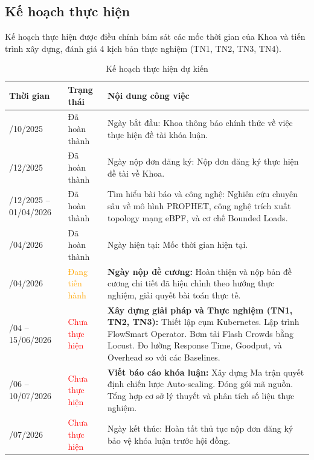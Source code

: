 \documentclass[14pt]{article}
\begin{document}
\subsection{Kế hoạch thực hiện}

Kế hoạch thực hiện được điều chỉnh bám sát các mốc thời gian của Khoa và tiến trình xây dựng, đánh giá 4 kịch bản thực nghiệm (TN1, TN2, TN3, TN4).

\begin{table}[H]
\centering
\caption{Kế hoạch thực hiện dự kiến}
\renewcommand{\arraystretch}{1.4}
\begin{tabular}{|>{\raggedright\arraybackslash}p{2.6cm}
                |>{\centering\arraybackslash}p{3.2cm}
                |>{\raggedright\arraybackslash}p{8.6cm}|}
\hline
\textbf{Thời gian} & \textbf{Trạng thái} & \textbf{Nội dung công việc} \\ \hline
19/10/2025
  & \textcolor{green!70!black}{Đã hoàn thành}
  & Ngày bắt đầu: Khoa thông báo chính thức về việc thực hiện đề tài khóa luận. \\ \hline
26/12/2025 
  & \textcolor{green!70!black}{Đã hoàn thành}
  & Ngày nộp đơn đăng ký: Nộp đơn đăng ký thực hiện đề tài về Khoa. \\ \hline
26/12/2025 -- 01/04/2026
  & \textcolor{green!70!black}{Đã hoàn thành}
  & Tìm hiểu bài báo và công nghệ: Nghiên cứu chuyên sâu về mô hình PROPHET, công nghệ trích xuất topology mạng eBPF, và cơ chế Bounded Loads. \\ \hline
04/04/2026
  & \textcolor{green!70!black}{Đã hoàn thành}
  & Ngày hiện tại: Mốc thời gian hiện tại. \\ \hline
06/04/2026
  & \textcolor{orange}{Đang tiến hành}
  & \textbf{Ngày nộp đề cương:} Hoàn thiện và nộp bản đề cương chi tiết đã hiệu chỉnh theo hướng thực nghiệm, giải quyết bài toán thực tế. \\ \hline
07/04 -- 15/06/2026
  & \textcolor{red}{Chưa thực hiện}
  & \textbf{Xây dựng giải pháp và Thực nghiệm (TN1, TN2, TN3):} Thiết lập cụm Kubernetes. Lập trình FlowSmart Operator. Bơm tải Flash Crowds bằng Locust. Đo lường Response Time, Goodput, và Overhead so với các Baselines. \\ \hline
01/06 -- 10/07/2026
  & \textcolor{red}{Chưa thực hiện}
  & \textbf{Viết báo cáo khóa luận:} Xây dựng Ma trận quyết định chiến lược Auto-scaling. Đóng gói mã nguồn. Tổng hợp cơ sở lý thuyết và phân tích số liệu thực nghiệm. \\ \hline
20/07/2026
  & \textcolor{red}{Chưa thực hiện}
  & Ngày kết thúc: Hoàn tất thủ tục nộp đơn đăng ký bảo vệ khóa luận trước hội đồng. \\ \hline
\end{tabular}
\end{table}
\end{document}
